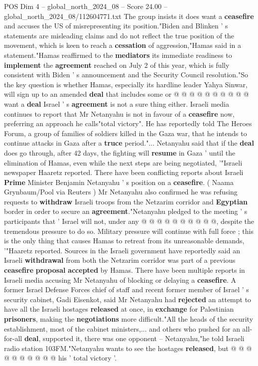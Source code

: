 \begin{textsample}{POS Dim 4 – global\_north\_2024\_08 – Score 24.00 – global\_north\_2024\_08/112604771.txt}
The group insists it does want a \textbf{ceasefire} and accuses the US of misrepresenting its position."Biden and Blinken ' s statements are misleading claims and do not reflect the true position of the movement, which is keen to reach a \textbf{cessation} of aggression,"Hamas said in a statement."Hamas reaffirmed to the \textbf{mediators} its immediate readiness to \textbf{implement} the \textbf{agreement} reached on July 2 of this year, which is fully consistent with Biden ' s announcement and the Security Council resolution."So the key question is whether Hamas, especially its hardline leader Yahya Sinwar, will sign up to an amended \textbf{deal} that includes some or @ @ @ @ @ @ @ @ @ @ want a \textbf{deal} Israel ' s \textbf{agreement} is not a sure thing either.
Israeli media continues to report that Mr Netanyahu is not in favour of a \textbf{ceasefire} now, preferring an approach he calls"total victory".
He has reportedly told The Heroes Forum, a group of families of soldiers killed in the Gaza war, that he intends to continue attacks in Gaza after a \textbf{truce} period."...
Netanyahu said that if the \textbf{deal} does go through, after 42 days, the fighting will \textbf{resume} in Gaza ' until the elimination of Hamas, even while the next steps are being negotiated, '"Israeli newspaper Haaretz reported.
There have been conflicting reports about Israeli \textbf{Prime} Minister Benjamin Netanyahu ' s position on a \textbf{ceasefire}. ( Naama Grynbaum/Pool via Reuters ) Mr Netanyahu also confirmed he was refusing requests to \textbf{withdraw} Israeli troops from the Netzarim corridor and \textbf{Egyptian} border in order to secure an \textbf{agreement}."Netanyahu pledged to the meeting ' s participants that ' Israel will not, under any @ @ @ @ @ @ @ @ @ @, despite the tremendous pressure to do so.
Military pressure will continue with full force ; this is the only thing that causes Hamas to retreat from its unreasonable demands, '"Haaretz reported.
Sources in the Israeli government have reportedly said an Israeli \textbf{withdrawal} from both the Netzarim corridor was part of a previous \textbf{ceasefire} \textbf{proposal} \textbf{accepted} by Hamas.
There have been multiple reports in Israeli media accusing Mr Netanyahu of blocking or delaying a \textbf{ceasefire}.
A former Israel Defense Forces chief of staff and recent former member of Israel ' s security cabinet, Gadi Eisenkot, said Mr Netanyahu had \textbf{rejected} an attempt to have all the Israeli hostages \textbf{released} at once, in \textbf{exchange} for Palestinian \textbf{prisoners}, making the \textbf{negotiations} more difficult."All the heads of the security establishment, most of the cabinet ministers,... and others who pushed for an all-for-all \textbf{deal}, supported it, there was one opponent -- Netanyahu,"he told Israeli radio station 103FM."Netanyahu wants to see the hostages \textbf{released}, but @ @ @ @ @ @ @ @ @ @ his ' total victory '.

\end{textsample}
